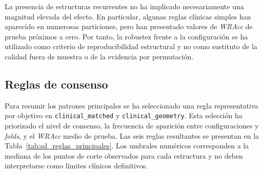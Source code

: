 La presencia de estructuras recurrentes no ha implicado necesariamente una magnitud elevada del efecto. En particular, algunas reglas clínicas simples han aparecido en numerosas particiones, pero han presentado valores de \textit{WRAcc} de prueba próximos a cero. Por tanto, la robustez frente a la configuración se ha utilizado como criterio de reproducibilidad estructural y no como sustituto de la calidad fuera de muestra o de la evidencia por permutación.

\subsection{Reglas de consenso}

Para resumir los patrones principales se ha seleccionado una regla representativa por objetivo en \texttt{clinical\_matched} y \texttt{clinical\_geometry}. Esta selección ha priorizado el nivel de consenso, la frecuencia de aparición entre configuraciones y \textit{folds}, y el \textit{WRAcc} medio de prueba. Las seis reglas resultantes se presentan en la Tabla~\ref{tab:sd_reglas_principales}. Los umbrales numéricos corresponden a la mediana de los puntos de corte observados para cada estructura y no deben interpretarse como límites clínicos definitivos.

